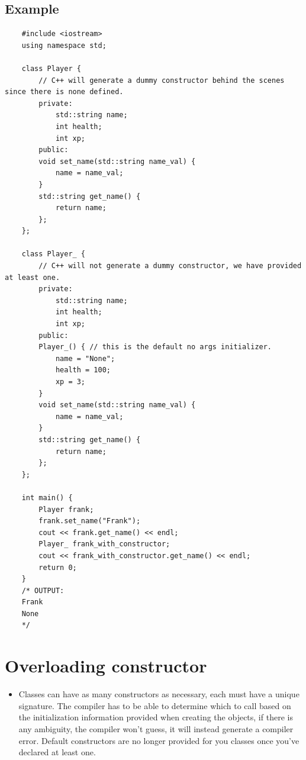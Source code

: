 \subsection{Example}
\begin{verbatim}
    #include <iostream>
    using namespace std;

    class Player {
        // C++ will generate a dummy constructor behind the scenes since there is none defined.
        private:
            std::string name;
            int health;
            int xp;
        public:
        void set_name(std::string name_val) {
            name = name_val;
        }
        std::string get_name() {
            return name;
        };
    };

    class Player_ {
        // C++ will not generate a dummy constructor, we have provided at least one.
        private:
            std::string name;
            int health;
            int xp;
        public:
        Player_() { // this is the default no args initializer.
            name = "None";
            health = 100;
            xp = 3;
        }
        void set_name(std::string name_val) {
            name = name_val;
        }
        std::string get_name() {
            return name;
        };
    };

    int main() {
        Player frank;
        frank.set_name("Frank");
        cout << frank.get_name() << endl;
        Player_ frank_with_constructor;
        cout << frank_with_constructor.get_name() << endl;
        return 0;
    }
    /* OUTPUT:
    Frank
    None
    */
\end{verbatim}


\section{Overloading constructor}
\begin{itemize}
    \item Classes can have as many constructors as necessary, each must have a unique signature. The compiler has to be able to determine which to call based on the initialization information provided when creating the objects, if there is any ambiguity, the compiler won't guess, it will instead generate a compiler error. Default constructors are no longer provided for you classes once you've declared at least one.
\end{itemize}

